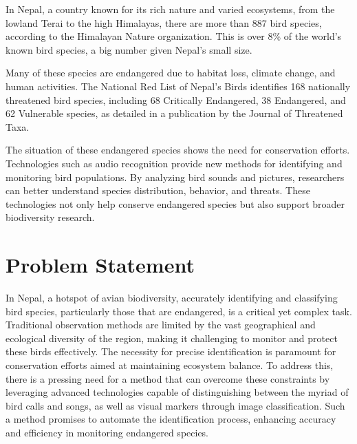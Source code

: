 In Nepal, a country known for its rich nature and varied ecosystems, from the lowland 
Terai to the high Himalayas, there are more than 887 bird species, according to the 
Himalayan Nature organization. This is over 8\% of the world's known bird species, 
a big number given Nepal's small size.\cite{himalayan}

Many of these species are endangered due to habitat loss, climate change, and human
 activities. The National Red List of Nepal's Birds identifies 168 nationally 
 threatened bird species, including 68 Critically Endangered, 38 Endangered, 
 and 62 Vulnerable species, as detailed in a publication by the Journal of 
 Threatened Taxa.\cite{inskipp2017nepala}

The situation of these endangered species shows the need for conservation efforts.
Technologies such as audio recognition provide new methods for identifying and monitoring 
bird populations. By analyzing bird sounds and pictures, researchers can better understand
species distribution, behavior, and threats. These technologies not only help conserve 
endangered species but also support broader biodiversity research.

\section{Problem Statement}
In Nepal, a hotspot of avian biodiversity, accurately identifying and
classifying bird species, particularly those that are endangered, is a critical
yet complex task. Traditional observation methods are limited by the vast
geographical and ecological diversity of the region, making it challenging to
monitor and protect these birds effectively. The necessity for precise
identification is paramount for conservation efforts aimed at maintaining
ecosystem balance. To address this, there is a pressing need for a method that
can overcome these constraints by leveraging advanced technologies capable of
distinguishing between the myriad of bird calls and songs, as well as visual
markers through image classification. Such a method promises to automate the
identification process, enhancing accuracy and efficiency in monitoring
endangered species.


